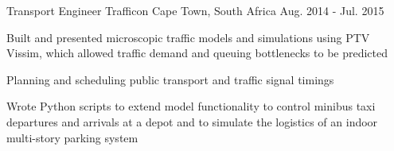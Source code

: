 \begin{cventries}
  \cventry
    {Transport Engineer} %
    {Trafficon} %
    {Cape Town, South Africa} %
    {Aug. 2014 - Jul. 2015} %
    {
      \begin{cvitems} %
        \item {Built and presented microscopic traffic models and simulations using PTV Vissim, which allowed traffic demand and queuing bottlenecks to
be predicted}
        \item {Planning and scheduling public transport and traffic signal timings}
        \item {Wrote Python scripts to extend model functionality to control minibus taxi departures and arrivals at a depot and to simulate the logistics of
an indoor multi-story parking system}
      \end{cvitems}
    }

\end{cventries}
